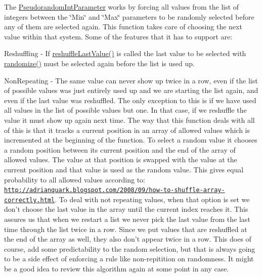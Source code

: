 The \hyperlink{class_picto_1_1_pseudorandom_int_parameter}{Pseudorandom\-Int\-Parameter} works by forcing all values from the list of integers between the \char`\"{}\-Min\char`\"{} and \char`\"{}\-Max\char`\"{} parameters to be randomly selected before any of them are selected again. This function takes care of choosing the next value within that system. Some of the features that it has to support are\-:
\begin{DoxyItemize}
\item Reshuffling -\/ If \hyperlink{class_picto_1_1_pseudorandom_int_parameter_a299104e7f698fc7058bb368f91d3025e}{reshuffle\-Last\-Value()} is called the last value to be selected with \hyperlink{class_picto_1_1_pseudorandom_int_parameter_a77d69b74839fc19dd17b3b01b348a2c0}{randomize()} must be selected again before the list is used up.
\item Non\-Repeating -\/ The same value can never show up twice in a row, even if the list of possible values was just entirely used up and we are starting the list again, and even if the last value was reshuffled. The only exception to this is if we have used all values in the list of possible values but one. In that case, if we reshuffle the value it must show up again next time. The way that this function deals with all of this is that it tracks a current position in an array of allowed values which is incremented at the beginning of the function. To select a random value it chooses a random position between its current position and the end of the array of allowed values. The value at that position is swapped with the value at the current position and that value is used as the random value. This gives equal probability to all allowed values according to\-: \href{http://adrianquark.blogspot.com/2008/09/how-to-shuffle-array-correctly.html}{\tt http\-://adrianquark.\-blogspot.\-com/2008/09/how-\/to-\/shuffle-\/array-\/correctly.\-html}. To deal with not repeating values, when that option is set we don't choose the last value in the array until the current index reaches it. This assures us that when we restart a list we never pick the last value from the last time through the list twice in a row. Since we put values that are reshuffled at the end of the array as well, they also don't appear twice in a row. This does of course, add some predictability to the random selection, but that is always going to be a side effect of enforcing a rule like non-\/repitition on randomness. It might be a good idea to review this algorithm again at some point in any case. 
\end{DoxyItemize}

